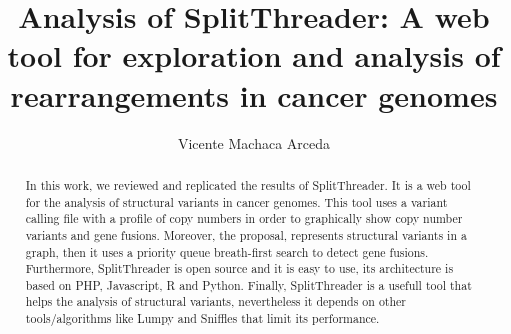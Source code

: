\documentclass{svproc}
\begin{document}
\mainmatter              %
%
\title{Analysis of SplitThreader: A web tool for exploration and analysis of rearrangements in cancer genomes}
%

\author{Vicente Machaca Arceda }


\maketitle             

\begin{abstract}

In this work, we reviewed and replicated the results of SplitThreader. It is a web tool for the analysis of structural variants in cancer genomes. This tool uses a variant calling file with a profile of copy numbers in order to graphically show copy number variants and gene fusions. Moreover, the proposal, represents structural variants in a graph, then it uses a priority queue breath-first search to detect gene fusions. Furthermore, SplitThreader is open source and it is easy to use, its architecture is based on PHP, Javascript, R and Python. Finally, SplitThreader is a usefull tool that helps the analysis of structural variants, nevertheless it depends on other tools/algorithms like Lumpy and Sniffles that limit its performance.

\end{abstract}



\end{document}
